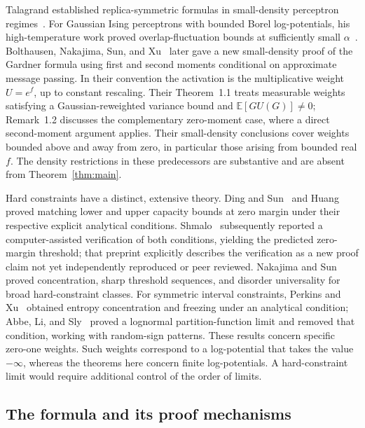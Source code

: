 Talagrand established replica-symmetric formulas in small-density
perceptron regimes~\cite{talagrand2000halfspaces}. For Gaussian Ising
perceptrons with bounded Borel log-potentials, his high-temperature work
proved overlap-fluctuation bounds at sufficiently small
$\alpha$~\cite{talagrand2002}. Bolthausen, Nakajima, Sun, and
Xu~\cite{bolthausen2022gardner} later gave a new small-density proof of the
Gardner formula using first and second moments conditional on approximate
message passing. In their convention the activation is the multiplicative
weight $U=e^f$, up to constant rescaling. Their Theorem~1.1 treats measurable
weights satisfying a Gaussian-reweighted variance bound and
$\mathbb E[G U(G)]\ne0$; Remark~1.2 discusses the complementary zero-moment
case, where a direct second-moment argument applies. Their small-density
conclusions cover weights bounded above and away from zero, in particular
those arising from bounded real $f$. The density restrictions in these predecessors are
substantive and are absent from Theorem~\ref{thm:main}.

Hard constraints have a distinct, extensive theory. Ding and
Sun~\cite{dingsun2025} and Huang~\cite{huang2024capacity} proved matching
lower and upper capacity bounds at zero margin under their respective
explicit analytical conditions. Shmalo~\cite{shmalo2026capacity} subsequently
reported a computer-assisted verification of both conditions, yielding the
predicted zero-margin threshold; that preprint explicitly describes the
verification as a new proof claim not yet independently reproduced or peer
reviewed. Nakajima and Sun~\cite{nakajimasun2022}
proved concentration, sharp threshold sequences, and disorder universality
for broad hard-constraint classes. For symmetric interval constraints,
Perkins and Xu~\cite{perkinsxu2024} obtained entropy concentration and
freezing under an analytical condition; Abbe, Li, and
Sly~\cite{abbeli2021} proved a lognormal partition-function limit and removed
that condition, working with random-sign patterns. These results concern
specific zero-one weights. Such weights correspond to a log-potential
that takes the value $-\infty$, whereas the theorems here concern finite
log-potentials. A hard-constraint limit would require additional control
of the order of limits.

\subsection{The formula and its proof mechanisms}

